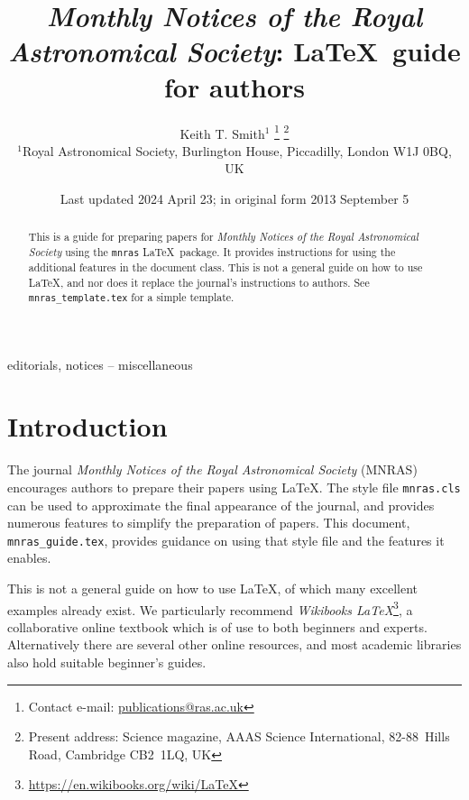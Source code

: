 \documentclass[fleqn,usenatbib,useAMS]{mnras}
\title[MNRAS \LaTeX\ guide for authors]{\textit{Monthly Notices of the Royal Astronomical
  Society}:  \LaTeX\ guide for authors}
\author[K. T. Smith]{Keith T. Smith$^{1}$%
\thanks{Contact e-mail: \href{mailto:publications@ras.ac.uk}{publications@ras.ac.uk}}%
\thanks{Present address: Science magazine, AAAS Science International, \mbox{82-88}~Hills Road, Cambridge CB2~1LQ, UK}%
\\
$^{1}$Royal Astronomical Society, Burlington House, Piccadilly, London W1J 0BQ, UK}
\date{Last updated 2024 April 23; in original form 2013 September 5}
\begin{document}
\label{firstpage}
\pagerange{\pageref{firstpage}--\pageref{lastpage}}
\maketitle

\begin{abstract}
This is a guide for preparing papers for \textit{Monthly Notices of the Royal Astronomical Society} using the \verb'mnras' \LaTeX\ package.
It provides instructions for using the additional features in the document class.
This is not a general guide on how to use \LaTeX, and nor does it replace the journal's instructions to authors.
See \texttt{mnras\_template.tex} for a simple template.
\end{abstract}

\begin{keywords}
editorials, notices -- miscellaneous
\end{keywords}



\begingroup
\let\clearpage\relax
\tableofcontents
\endgroup
\newpage

\section{Introduction}

The journal \textit{Monthly Notices of the Royal Astronomical Society} (MNRAS) encourages authors to prepare their papers using \LaTeX.
The style file \verb'mnras.cls' can be used to approximate the final appearance of the journal, and provides numerous features to simplify the preparation of papers.
This document, \verb'mnras_guide.tex', provides guidance on using that style file and the features it enables.

This is not a general guide on how to use \LaTeX, of which many excellent examples already exist.
We particularly recommend \textit{Wikibooks \LaTeX}\footnote{\url{https://en.wikibooks.org/wiki/LaTeX}}, a collaborative online textbook which is of use to both beginners and experts.
Alternatively there are several other online resources, and most academic libraries also hold suitable beginner's guides.
\end{document}
